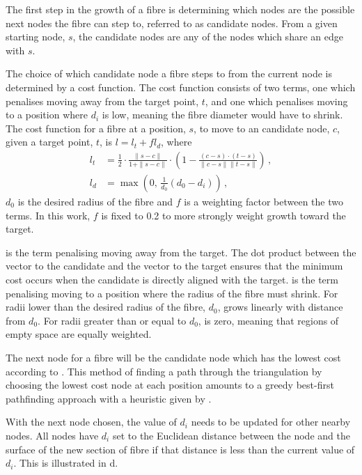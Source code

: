 The first step in the growth of a fibre is determining which nodes are the possible next nodes the fibre can step to, referred to as candidate nodes.
From a given starting node, $s$, the candidate nodes are any of the nodes which share an edge with $s$.

The choice of which candidate node a fibre steps to from the current node is determined by a cost function.
The cost function consists of two terms, one which penalises moving away from the target point, $t$, and one which penalises moving to a position where $d_i$ is low, meaning the fibre diameter would have to shrink. The cost function for a fibre at a position, $s$, to move to an candidate node, $c$, given a target point, $t$, is $l = l_t + fl_d$,
where
\begin{align}
l_t &= \frac{1}{2} \cdot \frac{\|s - c\|}{1 + \|s - c\|} \cdot \left(1 - \frac{(c -s)\cdot(t - s)}{\|c-s\|\|t-s\|}\right)\,,\label{eq:l_t}\\
l_d &= \max\left(0,\, \frac{1}{d_{0}} (d_0 - d_i)\right)\,,\label{eq:l_D}
\end{align}
$d_0$ is the desired radius of the fibre and $f$ is a weighting factor between the two terms. In this work, $f$ is fixed to 0.2 to more strongly weight growth toward the target.

 is the term penalising moving away from the target. The dot product between the vector to the candidate and the vector to the target ensures that the minimum cost occurs when the candidate is directly aligned with the target.
 is the term penalising moving to a position where the radius of the fibre must shrink.
For radii lower than the desired radius of the fibre, $d_0$,  grows linearly with distance from $d_0$.
For radii greater than or equal to $d_0$,  is zero, meaning that regions of empty space are equally weighted.

The next node for a fibre will be the candidate node which has the lowest cost according to .
This method of finding a path through the triangulation by choosing the lowest cost node at each position amounts to a greedy best-first pathfinding approach with a heuristic given by .

With the next node chosen, the value of $d_i$ needs to be updated for other nearby nodes.
All nodes have $d_i$ set to the Euclidean distance between the node and the surface of the new section of fibre if that distance is less than the current value of $d_i$. This is illustrated in d.

